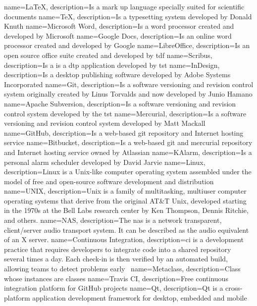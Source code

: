 {
    name=\LaTeX,
    description={Is a mark up language specially suited for scientific documents}
}
{
    name=\TeX,
    description={Is a typesetting system developed by Donald Knuth}
}
{
    name={Microsoft Word},
    description={Is a word processor created and developed by Microsoft}
}
{
    name={Google Docs},
    description={Is an online word processor created and developed by Google}
}
{
    name=LibreOffice,
    description={Is an open source office suite created and developed by \acrlong{tdf}}
}
{
    name=Scribus,
    description={Is a is a \acrlong{dtp} application developed by \acrlong{tst}}
}
{
    name=InDesign,
    description={Is a desktop publishing software developed by Adobe Systems Incorporated}
}
{
    name=Git,
    description={Is a software versioning and revision control system originally created by Linus Torvalds and now developed by Junio Hamano}
}
{
    name={Apache Subversion},
    description={Is a software versioning and revision control system developed by the \acrlong{tst}}
}
{
    name=Mercurial,
    description={Is a software versioning and revision control system developed by Matt Mackall}
}
{
    name=GitHub,
    description={Is a web-based \gls{git} repository and Internet hosting service}
}
{
    name=Bitbucket,
    description={Is a web-based \gls{git} and \gls{mercurial} repository and Internet hosting service owned by Atlassian}
}
{
    name=KAlarm,
    description={Is a personal alarm scheduler developed by David Jarvie}
}
{
    name=Linux,
    description={Linux is a Unix-like computer operating system assembled under the model of free and open-source software development and distribution}
}
{
    name=UNIX,
    description={Unix is a family of multitasking, multiuser computer operating systems that derive from the original AT\&T Unix, developed starting in the 1970s at the Bell Labs research center by Ken Thompson, Dennis Ritchie, and others.}
}
{
    name=NAS,
    description={The \acrlong{nas} is a network transparent, client/server audio transport system. It can be described as the audio equivalent of an X server.}
}
{
    name={Continuous Integration},
    description={\acrlong{ci} is a development practice that requires developers
    to integrate code into a shared repository several times a day.  Each
check-in is then verified by an automated build, allowing teams to detect
problems early~\cite{thoughtworks2017}}
}
{
    name=Metaclass,
    description={Class whose instances are classes}
}
{
    name={Travis CI},
    description={Free continuous integration platform for GitHub projects}
}
{
    name=Qt,
    description={Qt is a cross-platform application development framework for
    desktop, embedded and mobile~\cite{aboutQt2017}}
}

